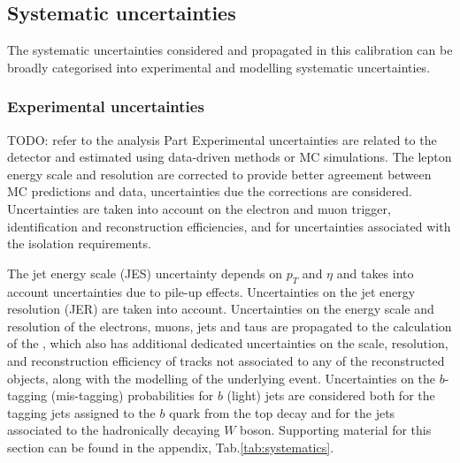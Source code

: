 \documentclass[letterpaper,12pt]{article}
\begin{document}
\subsection{Systematic uncertainties}
\label{sec:FTAG_systematics}
The systematic uncertainties considered and propagated in this calibration 
can be broadly categorised into experimental and modelling systematic uncertainties. 
\subsubsection{Experimental uncertainties}
TODO: refer to the analysis Part
Experimental uncertainties are related to the detector and estimated using 
data-driven methods or MC simulations. 
The lepton energy scale and resolution are corrected to 
provide better agreement between MC predictions and data, uncertainties 
due the corrections are considered. Uncertainties are taken into account on the 
electron and muon trigger, identification and reconstruction efficiencies, and for 
uncertainties associated with the isolation requirements. 

The jet energy scale (JES) uncertainty depends on $p_T$ and $\eta$ and 
takes into account uncertainties due to pile-up effects. Uncertainties on the jet energy resolution (JER) 
are taken into account. Uncertainties on the energy scale and resolution of 
the electrons, muons, jets and taus are propagated to the calculation of the \MET, 
which also has additional dedicated uncertainties on the scale, resolution, and 
reconstruction efficiency of tracks not associated to any of the reconstructed objects,
 along with the modelling of the underlying event. Uncertainties on the $b$-tagging (mis-tagging) 
 probabilities for $b$ (light) jets are considered both for the tagging jets assigned to the $b$ quark 
 from the top decay and for the jets associated to the hadronically decaying $W$ boson.
Supporting material for this section can be found in the appendix, Tab.\ref{tab:systematics}.
\end{document}
